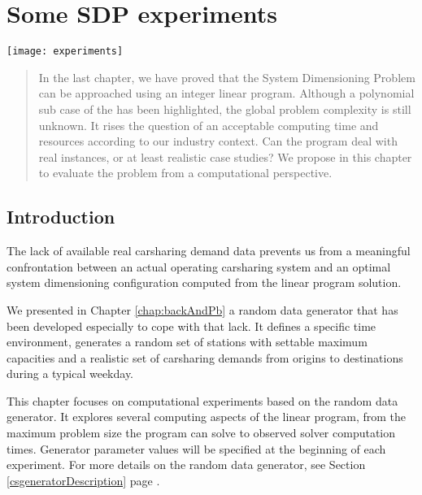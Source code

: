 \chapter{Some SDP experiments} \label{chap:sdpExp}
\minitoc
\vfill
\noindent
\begin{minipage}[c]{0.3\linewidth}
\texttt{[image: experiments]}
\end{minipage}
\hfill
\begin{minipage}[c]{0.7\linewidth}
\begin{abstract}
In the last chapter, we have proved that the System Dimensioning Problem {\SDP} can be approached using an integer linear program.
Although a polynomial sub case of the {\SDP} has been highlighted, the global problem complexity is still unknown.
It rises the question of an acceptable computing time and resources according to our industry context.
Can the program deal with real instances, or at least realistic case studies?
We propose in this chapter to evaluate the problem from a computational perspective.
\end{abstract}
\end{minipage}

\newpage
\section{Introduction}
The lack of available real carsharing demand data prevents us from a meaningful confrontation between an actual operating carsharing system and an optimal system dimensioning configuration computed from the linear program solution.

\bigskip
We presented in Chapter \ref{chap:backAndPb} a random data generator that has been developed especially to cope with that lack.
It defines a specific time environment, generates a random set of stations with settable maximum capacities and a realistic set of carsharing demands from origins to destinations during a typical weekday.

\bigskip
This chapter focuses on computational experiments based on the random data generator.
It explores several computing aspects of the linear program, from the maximum problem size the program can solve to observed solver computation times.
Generator parameter values will be specified at the beginning of each experiment.
For more details on the random data generator, see Section \ref{csgeneratorDescription} page \pageref{csgeneratorDescription}.

